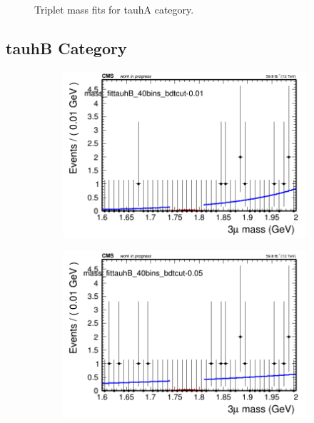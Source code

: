 \begin{figure}[H]
\begin{subfigure}{0.2\textwidth}
        \caption{}
    \end{subfigure}
    \caption{Triplet mass fits for tauhA category.}
    \label{fig:unfixedexptauhA}
\end{figure}

\subsection{tauhB Category}
\label{sec:unfixedexptauhB}

\begin{figure}[H]
    \centering
    \begin{subfigure}{0.2\textwidth}
        \includegraphics[width=\textwidth]{unfixed_exp/plots/tauhB/massfit_tauhB_40bins_bdtcut-0.01.png}
        \caption{}
    \end{subfigure}
    \begin{subfigure}{0.2\textwidth}
        \includegraphics[width=\textwidth]{unfixed_exp/plots/tauhB/massfit_tauhB_40bins_bdtcut-0.05.png}

\end{subfigure}
\end{figure}
